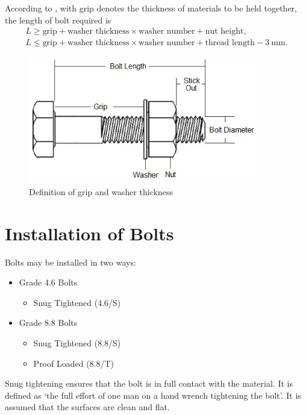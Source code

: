 According to \NZSSTEEL{~}, with grip denotes the thickness of materials to be held together, the length of bolt required is
\begin{gather*}
L\geqslant\text{grip}+\text{washer thickness}\times\text{washer number}+\text{nut height},\\
L\leqslant\text{grip}+\text{washer thickness}\times\text{washer number}+\text{thread length}-\SI{3}{\mm}.
\end{gather*}
\begin{figure}[H]
\centering\includegraphics[width=10cm]{PIC/CH06/GRIP}\caption{Definition of grip and washer thickness}
\end{figure}
\section{Installation of Bolts}
Bolts may be installed in two ways:
\begin{itemize}
\item Grade 4.6 Bolts
\begin{itemize}
\item Snug Tightened (4.6/S)
\end{itemize}
\item Grade 8.8 Bolts
\begin{itemize}
\item Snug Tightened (8.8/S)
\item Proof Loaded (8.8/T)
\end{itemize}
\end{itemize}

Snug tightening ensures that the bolt is in full contact with the material. It is defined as `the full effort of one man on a hand wrench tightening the bolt'. It is assumed that the surfaces are clean and flat.

